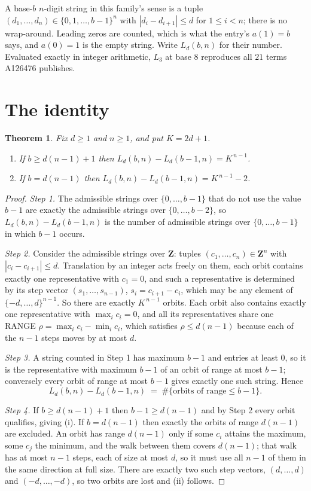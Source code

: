 \documentclass[11pt,a4paper]{article}
\theoremstyle{plain}
\newtheorem{theorem}{Theorem}
\theoremstyle{definition}
\begin{document}
A base-$b$ $n$-digit string in this family's sense is a tuple
$(d_1,\dots,d_n)\in\{0,1,\dots,b-1\}^{n}$ with $|d_i-d_{i+1}|\le d$ for $1\le i<n$; there
is no wrap-around. Leading zeros are counted, which is what the entry's $a(1)=b$ says, and
$a(0)=1$ is the empty string. Write $L_d(b,n)$ for their number. Evaluated exactly in integer
arithmetic, $L_{3}$ at base $8$ reproduces all $21$ terms A126476 publishes.

\section{The identity}

\begin{theorem}
Fix $d\ge1$ and $n\ge1$, and put $K=2d+1$.
\begin{enumerate}
\item[(i)] If $b\ge d(n-1)+1$ then $L_d(b,n)-L_d(b-1,n)=K^{\,n-1}$.
\item[(ii)] If $b=d(n-1)$ then $L_d(b,n)-L_d(b-1,n)=K^{\,n-1}-2$.
\end{enumerate}
\end{theorem}

\begin{proof}
\emph{Step 1.} The admissible strings over $\{0,\dots,b-1\}$ that do not use the value $b-1$
are exactly the admissible strings over $\{0,\dots,b-2\}$, so $L_d(b,n)-L_d(b-1,n)$ is the
number of admissible strings over $\{0,\dots,b-1\}$ in which $b-1$ occurs.

\emph{Step 2.} Consider the admissible strings over $\mathbf{Z}$: tuples
$(c_1,\dots,c_n)\in\mathbf{Z}^{n}$ with $|c_i-c_{i+1}|\le d$. Translation by an integer acts
freely on them, each orbit contains exactly one representative with $c_1=0$, and such a
representative is determined by its step vector $(s_1,\dots,s_{n-1})$, $s_i=c_{i+1}-c_i$,
which may be any element of $\{-d,\dots,d\}^{n-1}$. So there are exactly $K^{\,n-1}$ orbits.
Each orbit also contains exactly one representative with $\max_i c_i=0$, and all its
representatives share one RANGE $\rho=\max_ic_i-\min_ic_i$, which satisfies
$\rho\le d(n-1)$ because each of the $n-1$ steps moves by at most $d$.

\emph{Step 3.} A string counted in Step 1 has maximum $b-1$ and entries at least $0$, so it is
the representative with maximum $b-1$ of an orbit of range at most $b-1$; conversely every orbit
of range at most $b-1$ gives exactly one such string. Hence
\[
L_d(b,n)-L_d(b-1,n)\;=\;\#\{\text{orbits of range}\le b-1\} .
\]

\emph{Step 4.} If $b\ge d(n-1)+1$ then $b-1\ge d(n-1)$ and by Step 2 every orbit qualifies,
giving (i). If $b=d(n-1)$ then exactly the orbits of range $d(n-1)$ are excluded. An orbit has
range $d(n-1)$ only if some $c_i$ attains the maximum, some $c_j$ the minimum, and the walk
between them covers $d(n-1)$; that walk has at most $n-1$ steps, each of size at most $d$, so it
must use all $n-1$ of them in the same direction at full size. There are exactly two such step
vectors, $(d,\dots,d)$ and $(-d,\dots,-d)$, so two orbits are lost and (ii) follows.
\end{proof}
\end{document}
